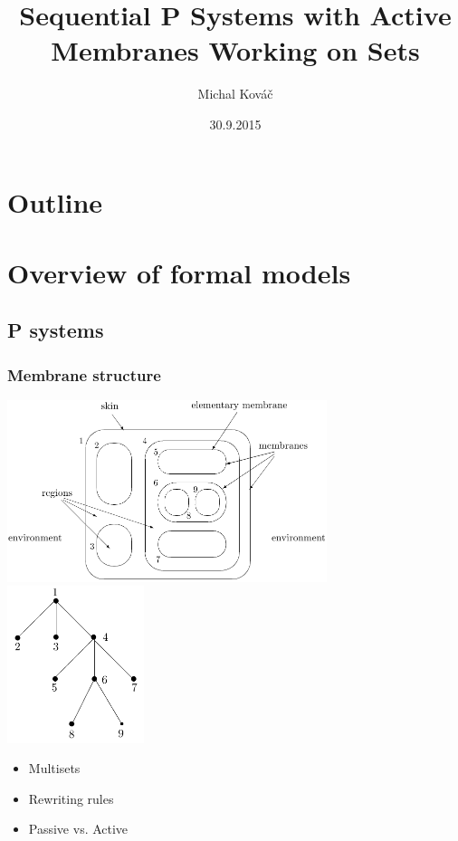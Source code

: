 \usepackage[utf8]{inputenc}
\usepackage{slovak}
\usepackage{tikz}
\usepackage{fancybox}
\usepackage[english]{babel}
\usetikzlibrary{arrows,positioning}

\title{Sequential P Systems with Active Membranes Working on Sets}
\author{Michal Kováč}
\date{30.9.2015}


\begin{frame}[t]
\titlepage
\end{frame}
\note{}

\section*{Outline}
\begin{frame}
\tableofcontents
\end{frame}
\note{}

\section{Overview of formal models} %
\label{sec:overview_of_formal_models}

  \subsection{P systems} %
  \label{sub:p_systems}

    \begin{frame}[t]\frametitle{Membrane structure}
      \includegraphics[width=0.7\textwidth]{membrane_structure.png}
      \hfill
      \includegraphics[width=0.3\textwidth]{membrane_tree.png}
      \pause
      \begin{itemize}
        \item Multisets
        \pause
        \item Rewriting rules
        \pause
        \item Passive vs. Active
      \end{itemize}

    \end{frame}
    \note{}

